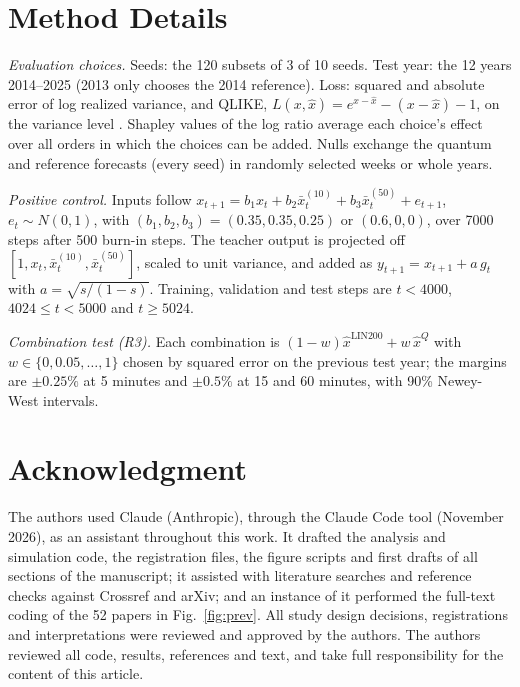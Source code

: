 \documentclass{ieeeaccess}
\begin{document}
\section{Method Details}
\label{app:methods}
\textit{Evaluation choices.} Seeds: the 120 subsets of 3 of 10 seeds. Test year: the 12 years 2014--2025 (2013 only chooses the 2014 reference). Loss: squared and absolute error of log realized variance, and QLIKE, $L(x,\hat{x})=e^{x-\hat{x}}-(x-\hat{x})-1$, on the variance level \cite{patton2011}. Shapley values of the log ratio average each choice's effect over all orders in which the choices can be added. Nulls exchange the quantum and reference forecasts (every seed) in randomly selected weeks or whole years.

\textit{Positive control.} Inputs follow $x_{t+1}=b_1x_t+b_2\bar{x}^{(10)}_t+b_3\bar{x}^{(50)}_t+e_{t+1}$, $e_t\sim N(0,1)$, with $(b_1,b_2,b_3)=(0.35,0.35,0.25)$ or $(0.6,0,0)$, over 7000 steps after 500 burn-in steps. The teacher output is projected off $[1,x_t,\bar{x}^{(10)}_t,\bar{x}^{(50)}_t]$, scaled to unit variance, and added as $y_{t+1}=x_{t+1}+a\,g_t$ with $a=\sqrt{s/(1-s)}$. Training, validation and test steps are $t<4000$, $4024\le t<5000$ and $t\ge5024$.

\textit{Combination test (R3).} Each combination is $(1-w)\hat{x}^{\mathrm{LIN200}}+w\,\hat{x}^{Q}$ with $w\in\{0,0.05,\dots,1\}$ chosen by squared error on the previous test year; the margins are $\pm0.25\%$ at 5 minutes and $\pm0.5\%$ at 15 and 60 minutes, with 90\% Newey-West intervals.

\section*{Acknowledgment}
The authors used Claude (Anthropic), through the Claude Code tool (November 2026), as an assistant throughout this work. It drafted the analysis and simulation code, the registration files, the figure scripts and first drafts of all sections of the manuscript; it assisted with literature searches and reference checks against Crossref and arXiv; and an instance of it performed the full-text coding of the 52 papers in Fig.~\ref{fig:prev}. All study design decisions, registrations and interpretations were reviewed and approved by the authors. The authors reviewed all code, results, references and text, and take full responsibility for the content of this article.
\end{document}
